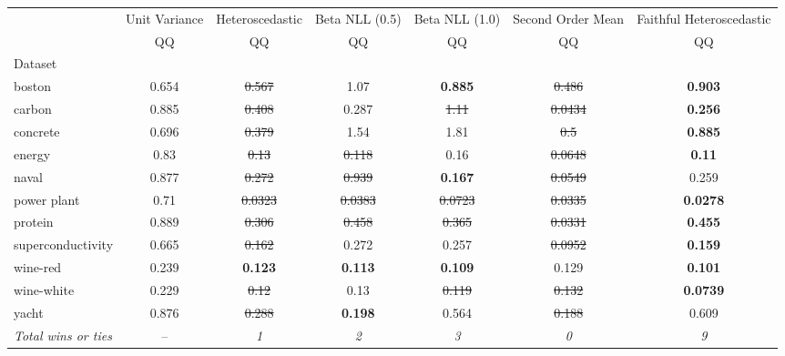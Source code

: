 \begin{tabular}{l|c|c|c|c|c|c}
\toprule
{} & {Unit Variance} & {Heteroscedastic} & {Beta NLL (0.5)} & {Beta NLL (1.0)} & {Second Order Mean} & {Faithful Heteroscedastic} \\
{} & {QQ} & {QQ} & {QQ} & {QQ} & {QQ} & {QQ} \\
{Dataset} & {} & {} & {} & {} & {} & {} \\
\midrule
boston & 0.654 & \sout{0.567} & 1.07 & \textbf{0.885} & \sout{0.486} & \textbf{0.903} \\
carbon & 0.885 & \sout{0.408} & 0.287 & \sout{1.11} & \sout{0.0434} & \textbf{0.256} \\
concrete & 0.696 & \sout{0.379} & 1.54 & 1.81 & \sout{0.5} & \textbf{0.885} \\
energy & 0.83 & \sout{0.13} & \sout{0.118} & 0.16 & \sout{0.0648} & \textbf{0.11} \\
naval & 0.877 & \sout{0.272} & \sout{0.939} & \textbf{0.167} & \sout{0.0549} & 0.259 \\
power plant & 0.71 & \sout{0.0323} & \sout{0.0383} & \sout{0.0723} & \sout{0.0335} & \textbf{0.0278} \\
protein & 0.889 & \sout{0.306} & \sout{0.458} & \sout{0.365} & \sout{0.0331} & \textbf{0.455} \\
superconductivity & 0.665 & \sout{0.162} & 0.272 & 0.257 & \sout{0.0952} & \textbf{0.159} \\
wine-red & 0.239 & \textbf{0.123} & \textbf{0.113} & \textbf{0.109} & 0.129 & \textbf{0.101} \\
wine-white & 0.229 & \sout{0.12} & 0.13 & \sout{0.119} & \sout{0.132} & \textbf{0.0739} \\
yacht & 0.876 & \sout{0.288} & \textbf{0.198} & 0.564 & \sout{0.188} & 0.609 \\
\textit{{Total wins or ties}} & -- & \textit{1} & \textit{2} & \textit{3} & \textit{0} & \textit{9} \\
\bottomrule
\end{tabular}

